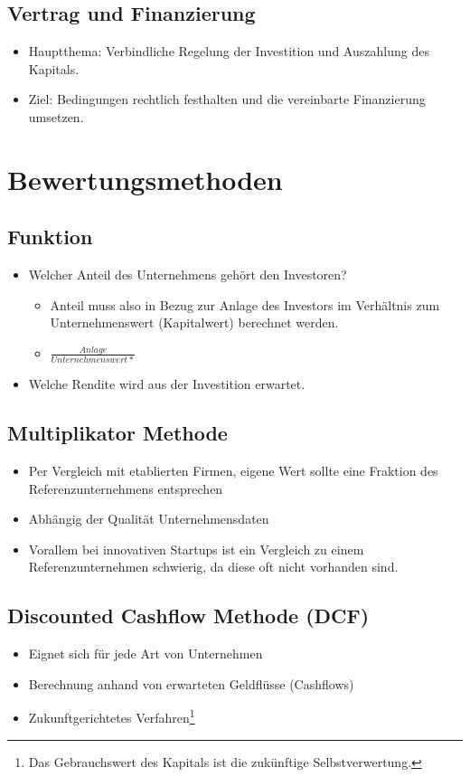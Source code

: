 \documentclass[a4paper]{article}
\begin{document}
    \subsection{Vertrag und Finanzierung}
    \begin{itemize}
        \item Hauptthema: Verbindliche Regelung der Investition und Auszahlung des Kapitals.
        \item Ziel: Bedingungen rechtlich festhalten und die vereinbarte Finanzierung umsetzen.
    \end{itemize}
    \section{Bewertungsmethoden}

    \subsection{Funktion}
    \begin{itemize}
        \item Welcher Anteil des Unternehmens gehört den Investoren?
        \begin{itemize}
            \item Anteil muss also in Bezug zur Anlage des Investors im Verhältnis zum Unternehmenswert (Kapitalwert) berechnet werden.
            \item $\frac{Anlage}{Unternehmenswert*}$
        \end{itemize}
        \item Welche Rendite wird aus der Investition erwartet.
    \end{itemize}

    \subsection{Multiplikator Methode}
    \begin{itemize}
        \item Per Vergleich mit etablierten Firmen, eigene Wert sollte eine Fraktion des Referenzunternehmens entsprechen
        \item Abhängig der Qualität Unternehmensdaten
        \item Vorallem bei innovativen Startups ist ein Vergleich zu einem Referenzunternehmen schwierig, da diese oft nicht vorhanden sind. 
    \end{itemize}
    
    \subsection{Discounted Cashflow Methode (DCF)}
    \begin{itemize}
        \item Eignet sich für jede Art von Unternehmen
        \item Berechnung anhand von erwarteten Geldflüsse (Cashflows)
        \item Zukunftgerichtetes Verfahren\footnote{Das Gebrauchswert des Kapitals ist die zukünftige Selbstverwertung. }
    \end{itemize}
\end{document}
